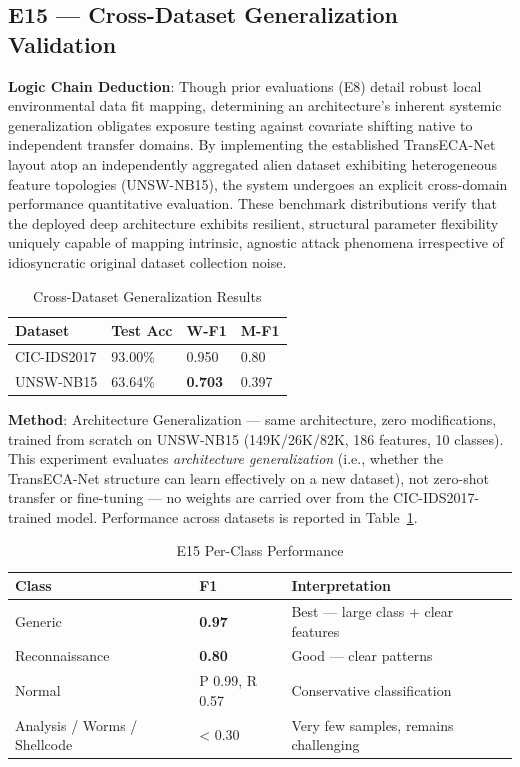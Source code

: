 \documentclass[sigconf]{acmart}
\begin{document}
\subsection{E15 --- Cross-Dataset Generalization Validation}
\textbf{Logic Chain Deduction}: Though prior evaluations (E8) detail robust local environmental data fit mapping, determining an architecture's inherent systemic generalization obligates exposure testing against covariate shifting native to independent transfer domains. By implementing the established TransECA-Net layout atop an independently aggregated alien dataset exhibiting heterogeneous feature topologies (UNSW-NB15), the system undergoes an explicit cross-domain performance quantitative evaluation. These benchmark distributions verify that the deployed deep architecture exhibits resilient, structural parameter flexibility uniquely capable of mapping intrinsic, agnostic attack phenomena irrespective of idiosyncratic original dataset collection noise.


\begin{table}[!t]
\caption{Cross-Dataset Generalization Results}
\label{tab:cross_gen}
\begin{tabular}{p{4.0cm}p{3.5cm}p{3.5cm}p{3.4cm}}
\toprule
\textbf{Dataset} & \textbf{Test Acc} & \textbf{W-F1} & \textbf{M-F1} \\
\midrule
CIC-IDS2017 & 93.00\% & 0.950 & 0.80 \\
UNSW-NB15 & 63.64\% & \textbf{0.703} & 0.397 \\
\bottomrule
\end{tabular}
\end{table}

\textbf{Method}: Architecture Generalization --- same architecture, zero modifications, trained from scratch on UNSW-NB15 \cite{8} (149K/26K/82K, 186 features, 10 classes). This experiment evaluates \emph{architecture generalization} (i.e., whether the TransECA-Net structure can learn effectively on a new dataset), not zero-shot transfer or fine-tuning --- no weights are carried over from the CIC-IDS2017-trained model. Performance across datasets is reported in Table~\ref{tab:cross_gen}.


\begin{table}[!t]
\caption{E15 Per-Class Performance}
\label{tab:e15_per_class}
\begin{tabular}{p{5.0cm}p{3.0cm}p{8.4cm}}
\toprule
\textbf{Class} & \textbf{F1} & \textbf{Interpretation} \\
\midrule
Generic & \textbf{0.97} & Best --- large class + clear features \\
Reconnaissance & \textbf{0.80} & Good --- clear patterns \\
Normal & P 0.99, R 0.57 & Conservative classification \\
Analysis / Worms / Shellcode & < 0.30 & Very few samples, remains challenging \\
\bottomrule
\end{tabular}
\end{table}
\end{document}
